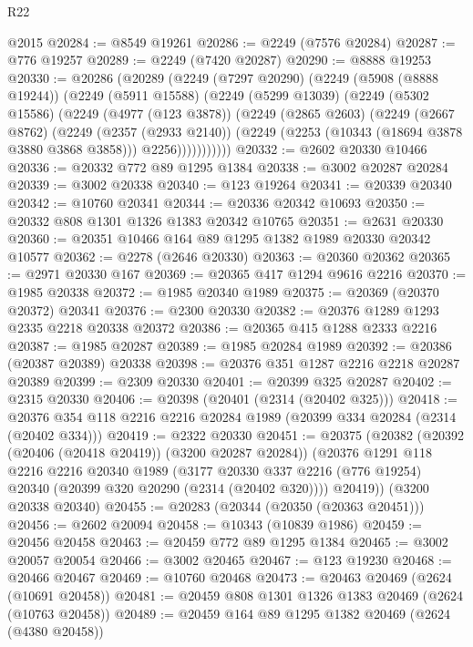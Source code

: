 \begin{lexlean}{R22}
\begin{coremodule}
    @2015
@20284 := @8549 @19261
@20286 := @2249 (@7576 @20284)
@20287 := @776 @19257
@20289 := @2249 (@7420 @20287)
@20290 := @8888 @19253
@20330 := @20286
    (@20289
      (@2249
        (@7297 @20290)
        (@2249
          (@5908 (@8888 @19244))
          (@2249
            (@5911 @15588)
            (@2249
              (@5299 @13039)
              (@2249
                (@5302 @15586)
                (@2249
                  (@4977 (@123 @3878))
                  (@2249
                    (@2865 @2603)
                    (@2249
                      (@2667 @8762)
                      (@2249
                        (@2357 (@2933 @2140))
                        (@2249 (@2253 (@10343 (@18694 @3878 @3880 @3868 @3858))) @2256)))))))))))
@20332 := @2602 @20330 @10466
@20336 := @20332 @772 @89 @1295 @1384
@20338 := @3002 @20287 @20284
@20339 := @3002 @20338
@20340 := @123 @19264
@20341 := @20339 @20340
@20342 := @10760 @20341
@20344 := @20336 @20342 @10693
@20350 := @20332 @808 @1301 @1326 @1383 @20342 @10765
@20351 := @2631 @20330
@20360 := @20351 @10466 @164 @89 @1295 @1382 @1989 @20330 @20342 @10577
@20362 := @2278 (@2646 @20330)
@20363 := @20360 @20362
@20365 := @2971 @20330 @167
@20369 := @20365 @417 @1294 @9616 @2216
@20370 := @1985 @20338
@20372 := @1985 @20340 @1989
@20375 := @20369 (@20370 @20372) @20341
@20376 := @2300 @20330
@20382 := @20376 @1289 @1293 @2335 @2218 @20338 @20372
@20386 := @20365 @415 @1288 @2333 @2216
@20387 := @1985 @20287
@20389 := @1985 @20284 @1989
@20392 := @20386 (@20387 @20389) @20338
@20398 := @20376 @351 @1287 @2216 @2218 @20287 @20389
@20399 := @2309 @20330
@20401 := @20399 @325 @20287
@20402 := @2315 @20330
@20406 := @20398 (@20401 (@2314 (@20402 @325)))
@20418 := @20376 @354 @118 @2216 @2216 @20284 @1989 (@20399 @334 @20284 (@2314 (@20402 @334)))
@20419 := @2322 @20330
@20451 := @20375
    (@20382
      (@20392 (@20406 (@20418 @20419)) (@3200 @20287 @20284))
      (@20376
        @1291
        @118
        @2216
        @2216
        @20340
        @1989
        (@3177 @20330 @337 @2216 (@776 @19254) @20340 (@20399 @320 @20290 (@2314 (@20402 @320))))
        @20419))
    (@3200 @20338 @20340)
@20455 := @20283 (@20344 (@20350 (@20363 @20451)))
@20456 := @2602 @20094
@20458 := @10343 (@10839 @1986)
@20459 := @20456 @20458
@20463 := @20459 @772 @89 @1295 @1384
@20465 := @3002 @20057 @20054
@20466 := @3002 @20465
@20467 := @123 @19230
@20468 := @20466 @20467
@20469 := @10760 @20468
@20473 := @20463 @20469 (@2624 (@10691 @20458))
@20481 := @20459 @808 @1301 @1326 @1383 @20469 (@2624 (@10763 @20458))
@20489 := @20459 @164 @89 @1295 @1382 @20469 (@2624 (@4380 @20458))

\end{coremodule}
\end{lexlean}
